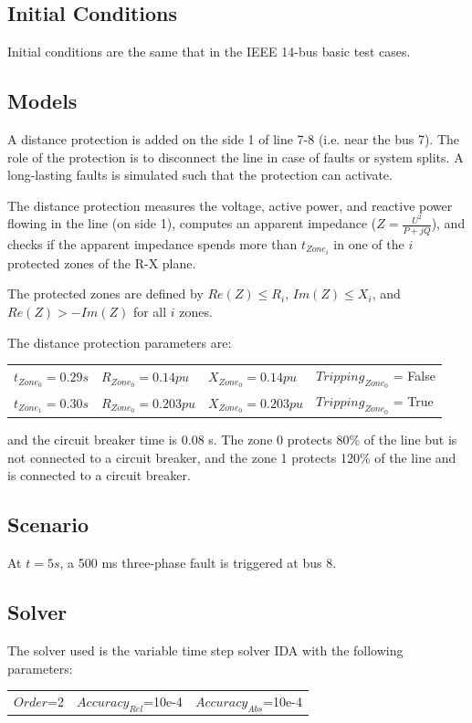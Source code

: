 \documentclass[a4paper, 12pt]{report}
\begin{document}
\subsection{Initial Conditions}

Initial conditions are the same that in the IEEE 14-bus basic test cases.

\subsection{Models}

A distance protection is added on the side 1 of line 7-8 (i.e. near the bus 7). The role of the protection is to disconnect the line in case of faults or system splits. A long-lasting faults is simulated such that the protection can activate.

The distance protection measures the voltage, active power, and reactive power flowing in the line (on side 1), computes an apparent impedance (\(Z = \frac{U^2}{P + jQ}\)), and checks if the apparent impedance spends more than \(t_{Zone_i}\) in one of the \(i\) protected zones of the R-X plane.

The protected zones are defined by \(Re(Z) \leq R_i\), \(Im(Z) \leq X_i\), and \(Re(Z) > -Im(Z)\)  for all \(i\) zones.


The distance protection parameters are:
\begin{center}
\begin{tabular}{l|l|l|l}
   $t_{Zone_0}=0.29s$ & $R_{Zone_0}=0.14pu$ & $X_{Zone_0}=0.14pu$ & $Tripping_{Zone_0}$ = False  \\
   $t_{Zone_1}=0.30s$ & $R_{Zone_0}=0.203pu$ & $X_{Zone_0}=0.203pu$ & $Tripping_{Zone_0}$ = True  \\
\end{tabular}
\end{center}
and the circuit breaker time is 0.08 s. The zone 0 protects 80\% of the line but is not connected to a circuit breaker, and the zone 1 protects 120\% of the line and is connected to a circuit breaker.

\subsection{Scenario}
At $t=5s$, a 500 ms three-phase fault is triggered at bus 8.

\subsection{Solver}
The solver used is the variable time step solver IDA with the following parameters:
\begin{center}
\begin{tabular}{l|l|l}
   $Order$=2 & $Accuracy_{Rel}$=10e-4 & $Accuracy_{Abs}$=10e-4 \\
\end{tabular}
\end{center}
\end{document}
